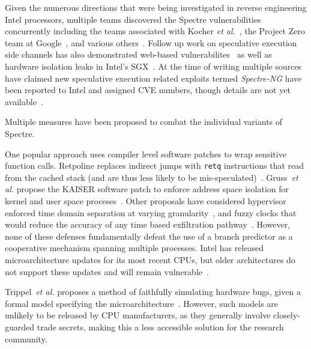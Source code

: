 Given the numerous directions that were being investigated in reverse
engineering Intel processors, multiple teams discovered the Spectre
vulnerabilities concurrently including the teams associated with Kocher
\textit{et al.}~\cite{spectre}, the Project Zero team at
Google~\cite{project_zero}, and various
others~\cite{evtyushkin2018branchscope,maisuradze2018speculose}. 
Follow 
up work on speculative execution side channels has also demonstrated
web-based vulnerabilites~\cite{genkin2018drive} as well as hardware isolation  
leaks in Intel's SGX~\cite{spectre_sgx}. At the time of writing multiple sources
have claimed new speculative execution related exploits termed \textit{Spectre-NG}
have been reported to Intel and assigned CVE numbers, though details are
not yet available~\cite{spectre_ng_gossip}.



Multiple measures have been proposed to combat the 
individual variants of Spectre.

One popular approach uses compiler level software patches to wrap sensitive 
function calls. Retpoline replaces indirect jumps with \texttt{retq}
instructions that read from the cached stack (and are thus less likely to be
mis-speculated)~\cite{retpoline}.
Gruss~\textit{et al.} propose the KAISER software patch to enforce address space
isolation for kernel and user space proceses~\cite{gruss2017kaslr}. 
Other proposals have considered hypervisor enforced time domain separation at varying 
granularity~\cite{renau2018securing}, and fuzzy clocks that would reduce the accuracy 
of any time based exfiltration pathway~\cite{hu1992reducing}. However, none of these defenses
fundamentally defeat the use of a branch predictor as a cooperative mechanism
spanning multiple processes. Intel has released microarchitecture updates for
its most recent CPUs, but older architectures do not support these updates and
will remain vulnerable~\cite{intel-micro-patch}.


Trippel~\textit{et al.} proposes a method of faithfully simulating hardware
bugs, given a formal model specifying the
microarchitecture~\cite{trippel2018meltdownprime}. However, such models are
unlikely to be released by CPU manufacturers, as they generally involve
closely-guarded trade secrets, making this a less accessible solution for the
research community.

%



